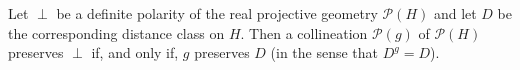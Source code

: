 Let $\perp$ be a definite polarity of the real projective geometry $\mathcal{P}(H)$ and let $D$ be the corresponding distance class on $H$. Then a collineation $\mathcal{P}(g)$ of $\mathcal{P}(H)$ preserves $\perp$ if, and only if, $g$ preserves $D$ (in the sense that $D^g = D$).
